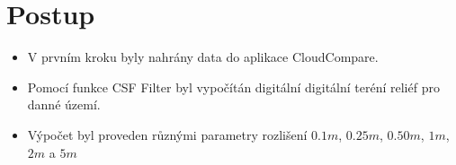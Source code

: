\section{Postup}
\begin{itemize}
    \item V prvním kroku byly nahrány data do aplikace CloudCompare.
    \item Pomocí funkce CSF Filter byl vypočítán digitální digitální teréní reliéf pro danné území.
    \item Výpočet byl proveden různými parametry rozlišení $0.1 m$, $0.25 m$, $0.50 m$, $1 m$, $2 m$ a $5 m$
\end{itemize}